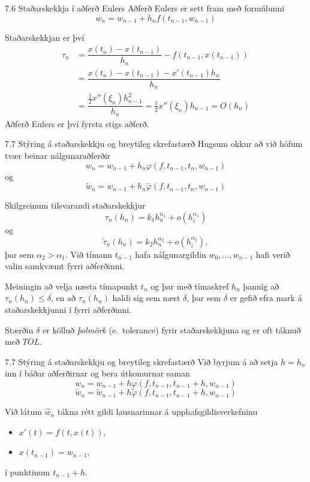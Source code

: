 \begin{frame}{7.6 Staðarskekkja í aðferð Eulers} 
Aðferð Eulers er sett fram með formúlunni
$$
  w_n=w_{n-1}+h_nf(t_{n-1},w_{n-1})
$$ 

\pause
Staðarskekkjan er því
\begin{align*}
  \tau_n&=\dfrac{x(t_n)-x(t_{n-1})}{h_n}-f(t_{n-1},x(t_{n-1}))\\
&=\dfrac{x(t_n)-x(t_{n-1})-x'(t_{n-1})h_n}{h_n}\\
&=\dfrac{\tfrac 12 x''(\xi_{n})h_{n-1}^2}{h_n}
=\tfrac 12 x''(\xi_{n})h_{n-1}=O(h_n)
\end{align*}
Aðferð Eulers er því fyrsta stigs aðferð.
\end{frame}


\begin{frame}{7.7 Stýring á staðarskekkju og breytileg skrefastærð} 
Hugsum okkur að við höfum tvær beinar nálgunaraðferðir
$$
 w_{n} = w_{n-1} + h_n\varphi(f,t_{n-1},t_n,w_{n-1})
$$
og
$$
  \tilde w_{n} = w_{n-1} + h_n\tilde\varphi(f,t_{n-1},t_n,w_{n-1})
$$

\pause
Skilgreinum tilsvarandi staðarskekkjur
  $$ \tau_n(h_n) = k_1h_n^{\alpha_1} + o(h_i^{\alpha_1}) 
$$
og
  $$ \tilde\tau_n(h_n) = k_2h_n^{\alpha_2} + o(h_i^{\alpha_2}),
$$
þar sem  $\alpha_2>\alpha_1$.  Við tímann $t_{n-1}$ hafa
nálgunargildin $w_0,\ldots,w_{n-1}$ hafi verið valin  samkvæmt 
fyrri aðferðinni.  

\pause
\smallskip
Meiningin að velja næsta tímapunkt $t_n$ og þar með tímaskref $h_n$
þannig að $\tau_n(h_n)\leq \delta$, en að $\tau_n(h_n)$ haldi sig
sem næst $\delta$, þar sem $\delta $ er gefið  efra mark á
staðarskekkjunni í fyrri aðferðinni.  

\pause
\smallskip
Stærðin $\delta$ er  kölluð 
{\it  þolmörk} (e.~tolerance) fyrir staðarskekkjuna 
og er oft táknuð með $TOL$.
\end{frame}


\begin{frame}{7.7 Stýring á staðarskekkju og breytileg skrefastærð} 
Við byrjum á að setja $h=h_{n}$ inn í báðar
aðferðirnar og bera útkomurnar  saman
  \[ w_{n} = w_{n-1} + h\varphi(f,t_{n-1},t_{n-1}+h,w_{n-1}) \]
  \[ \tilde w_{n} = \tilde w_{n-1} + 
h\tilde\varphi(f,t_{n-1},t_{n-1}+h,w_{n-1}) \]  

\pause
\smallskip
Við látum $\hat w_{n}$ tákna rétt gildi lausnarinnar á
upphafsgildisverkefninu 
\begin{itemize}
 \item $x'(t)=f(t,x(t))$, 
 \item $x(t_{n-1})=w_{n-1}$,
\end{itemize}
í punktinum $t_{n-1}+h$.
\end{frame}


